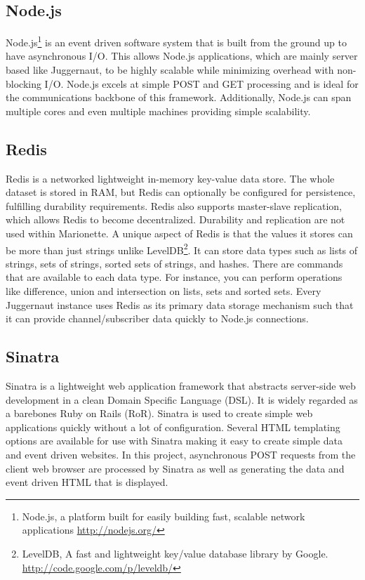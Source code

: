 \documentclass[12pt]{report}	%
\theoremstyle{definition}
\theoremstyle{remark}
\begin{document}
\subsection{Node.js}

Node.js\footnote{Node.js, a platform built for easily building fast, 
scalable network applications \linebreak \url{http://nodejs.org/}} is an event 
driven software system that is built from the
ground up to have asynchronous I/O. This allows Node.js applications,
which are mainly server based like Juggernaut, to be highly scalable while minimizing
overhead with non-blocking I/O. Node.js excels at simple POST and GET
processing and is ideal for the communications backbone of this
framework. Additionally, Node.js can span multiple cores and even
multiple machines providing simple scalability.

\subsection{Redis}

Redis is a networked lightweight in-memory key-value data store. The
whole dataset is stored in RAM, but Redis can optionally be configured
for persistence, fulfilling durability requirements. Redis also supports
master-slave replication, which allows Redis to become decentralized. 
Durability and replication are not used within Marionette. A
unique aspect of Redis is that the values it stores can be more than
just strings unlike LevelDB\footnote{LevelDB, A fast and lightweight key/value 
database library by Google. \linebreak \url{http://code.google.com/p/leveldb/}}. 
It can store data types such as lists of strings, sets of
strings, sorted sets of strings, and hashes. There are commands that are
available to each data type. For instance, you can perform operations
like difference, union and intersection on lists, sets and sorted sets.
Every Juggernaut instance uses Redis as its primary data storage mechanism such that it
can provide channel/subscriber data quickly to Node.js connections.

\subsection{Sinatra}

Sinatra is a lightweight web application framework that abstracts
server-side web development in a clean Domain Specific Language (DSL).
It is widely regarded as a barebones Ruby on Rails (RoR).
Sinatra is used to create simple web applications quickly without a lot of configuration.
Several HTML templating options are available for use with Sinatra
making it easy to create simple data and event driven websites. In this
project, asynchronous POST requests from the client web browser are
processed by Sinatra as well as generating the data and event driven
HTML that is displayed.
\end{document}
